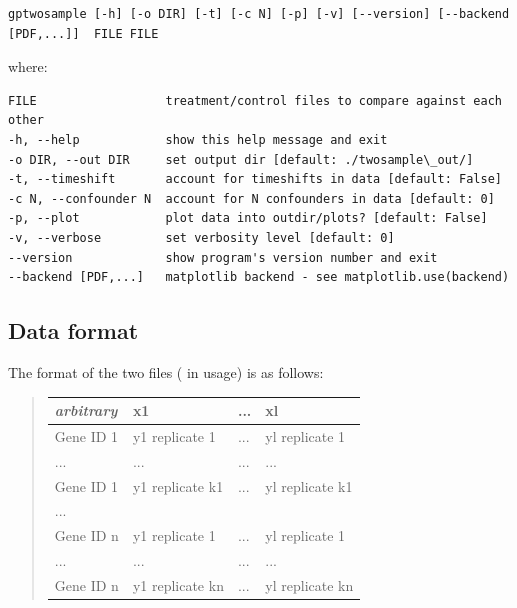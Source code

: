 \documentclass[letterpaper,10pt,english]{sphinxmanual}
\begin{document}
\begin{Verbatim}[commandchars=\\\{\}]
gptwosample [-h] [-o DIR] [-t] [-c N] [-p] [-v] [--version] [--backend [PDF,...]]  FILE FILE
\end{Verbatim}

where:

\begin{Verbatim}[commandchars=\\\{\}]
FILE                  treatment/control files to compare against each other
-h, --help            show this help message and exit
-o DIR, --out DIR     set output dir [default: ./twosample\_out/]
-t, --timeshift       account for timeshifts in data [default: False]
-c N, --confounder N  account for N confounders in data [default: 0]
-p, --plot            plot data into outdir/plots? [default: False]
-v, --verbose         set verbosity level [default: 0]
--version             show program's version number and exit
--backend [PDF,...]   matplotlib backend - see matplotlib.use(backend)
\end{Verbatim}


\subsection{Data format}
\label{usage:dataformat}\label{usage:data-format}
The format of the two  files ( in usage) is as follows:
\begin{quote}

\begin{tabulary}{\linewidth}{|L|L|L|L|}
\hline
\textbf{
\emph{arbitrary}
} & \textbf{
x1
} & \textbf{
...
} & \textbf{
xl
}\\\hline

Gene ID 1
 & 
y1 replicate 1
 & 
...
 & 
yl replicate 1
\\\hline

...
 & 
...
 & 
...
 & 
...
\\\hline

Gene ID 1
 & 
y1 replicate k1
 & 
...
 & 
yl replicate k1
\\\hline

...
 &  &  & \\\hline

Gene ID n
 & 
y1 replicate 1
 & 
...
 & 
yl replicate 1
\\\hline

...
 & 
...
 & 
...
 & 
...
\\\hline

Gene ID n
 & 
y1 replicate kn
 & 
...
 & 
yl replicate kn
\\\hline
\end{tabulary}

\end{quote}
\end{document}
